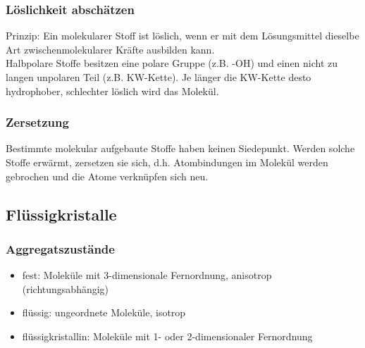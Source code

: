 \subsubsection{Löslichkeit abschätzen}
Prinzip: Ein molekularer Stoff ist löslich, wenn er mit dem Lösungsmittel dieselbe Art zwischenmolekularer Kräfte ausbilden kann. \\
Halbpolare Stoffe besitzen eine polare Gruppe (z.B. -OH) und einen nicht zu langen unpolaren Teil (z.B. KW-Kette). Je länger die KW-Kette desto hydrophober, schlechter löslich wird das Molekül.

\subsubsection{Zersetzung}
Bestimmte molekular aufgebaute Stoffe haben keinen Siedepunkt. Werden solche Stoffe erwärmt, zersetzen sie sich, d.h. Atombindungen im Molekül werden gebrochen und die Atome verknüpfen sich neu.

\subsection{Flüssigkristalle}
\subsubsection{Aggregatszustände}
\begin{itemize}
	\item fest: Moleküle mit 3-dimensionale Fernordnung, anisotrop (richtungsabhängig)
	\item flüssig: ungeordnete Moleküle, isotrop
	\item flüssigkristallin: Moleküle mit 1- oder 2-dimensionaler Fernordnung
\end{itemize}

